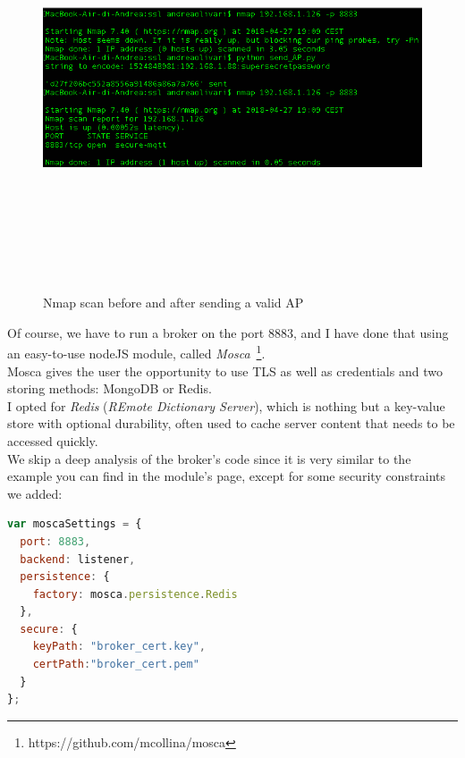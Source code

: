 \documentclass[12pt]{report}
\begin{document}
{{\begin{figure}[H]
\includegraphics[width=13cm,height=12cm,keepaspectratio]{nmap_proof}
\centering
\caption{Nmap scan before and after sending a valid AP}
\label{fig:nmapproof}
\end{figure}

Of course, we have to run a broker on the port 8883, and I have done that using an easy-to-use nodeJS module, called \emph{Mosca}~\footnote{https://github.com/mcollina/mosca}.\\ 

Mosca gives the user the opportunity to use TLS as well as credentials and two storing methods: MongoDB or Redis.\\
I opted for \emph{Redis} (\emph{REmote Dictionary Server}), which is  nothing but a key-value store with optional durability, often used to cache server content that needs to be accessed quickly.\\
We skip a deep analysis of the broker's code since it is very similar to the example you can find in the module's page, except for some security constraints we added:

\begin{center}
  \lstset{%
    caption=Mosca broker security settings,
    basicstyle=\ttfamily\small\bfseries,
    frame=tb
  }
\begin{lstlisting}[language=javascript,caption=Mosca broker security settings]
var moscaSettings = {
  port: 8883,
  backend: listener,
  persistence: {
    factory: mosca.persistence.Redis
  },
  secure: {
    keyPath: "broker_cert.key",
    certPath:"broker_cert.pem"
  }
};


\end{lstlisting}
\end{center}}}
\end{document}
